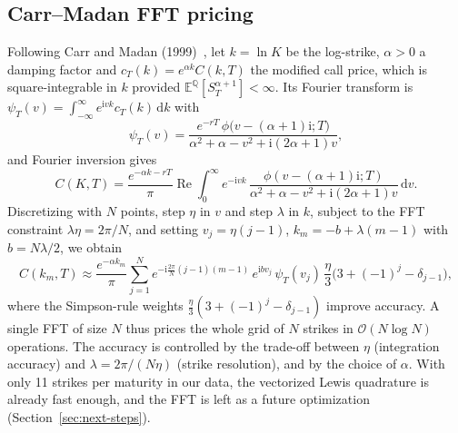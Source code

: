 \documentclass[11pt,a4paper]{article}
\theoremstyle{plain}
\theoremstyle{definition}
\newcommand{\dd}{\mathrm{d}}
\newcommand{\E}{\mathbb{E}}
\newcommand{\Q}{\mathbb{Q}}
\newcommand{\Real}{\operatorname{Re}}
\newcommand{\iu}{\mathrm{i}}
\begin{document}
\subsection{Carr--Madan FFT pricing}
Following Carr and Madan (1999)~\cite{carrmadan}, let $k=\ln K$ be the log-strike, $\alpha>0$ a damping factor and $c_T(k)=e^{\alpha k}C(k,T)$ the modified call price, which is square-integrable in $k$ provided $\E^\Q[S_T^{\alpha+1}]<\infty$. Its Fourier transform is $\psi_T(v)=\int_{-\infty}^{\infty}e^{\iu vk}c_T(k)\,\dd k$ with
\begin{equation}
    \psi_T(v) = \frac{e^{-rT}\,\phi\bigl(v-(\alpha+1)\iu;T\bigr)}{\alpha^2+\alpha-v^2+\iu(2\alpha+1)v},
\end{equation}
and Fourier inversion gives
\begin{equation}
    C(K, T) = \frac{e^{-\alpha k-rT}}{\pi} \Real\int_0^\infty e^{-\iu vk}\, \frac{\phi(v - (\alpha + 1)\iu; T)}{\alpha^2 + \alpha - v^2 + \iu(2\alpha + 1)v} \, \dd v.
    \label{eq:carrmadan}
\end{equation}
Discretizing with $N$ points, step $\eta$ in $v$ and step $\lambda$ in $k$, subject to the FFT constraint $\lambda\eta=2\pi/N$, and setting $v_j=\eta(j-1)$, $k_m=-b+\lambda(m-1)$ with $b=N\lambda/2$, we obtain
\begin{equation}
    C(k_m,T)\approx\frac{e^{-\alpha k_m}}{\pi}\sum_{j=1}^{N}e^{-\iu\frac{2\pi}{N}(j-1)(m-1)}\,e^{\iu bv_j}\,\psi_T(v_j)\,\frac{\eta}{3}\bigl(3+(-1)^j-\delta_{j-1}\bigr),
\end{equation}
where the Simpson-rule weights $\frac{\eta}{3}(3+(-1)^j-\delta_{j-1})$ improve accuracy. A single FFT of size $N$ thus prices the whole grid of $N$ strikes in $\mathcal O(N\log N)$ operations. The accuracy is controlled by the trade-off between $\eta$ (integration accuracy) and $\lambda=2\pi/(N\eta)$ (strike resolution), and by the choice of $\alpha$. With only 11 strikes per maturity in our data, the vectorized Lewis quadrature is already fast enough, and the FFT is left as a future optimization (Section~\ref{sec:next-steps}).
\end{document}
